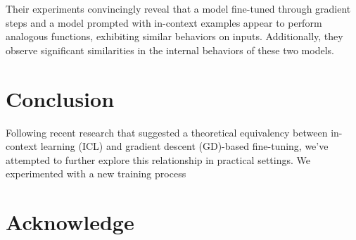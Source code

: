 \documentclass[11pt]{article}
\begin{document}
Their experiments convincingly reveal that a model fine-tuned through gradient steps and a model prompted with in-context examples appear to perform analogous functions, exhibiting similar behaviors on inputs.
Additionally, they observe significant similarities in the internal behaviors of these two models.




\section{Conclusion}
Following recent research that suggested a theoretical equivalency between in-context learning (ICL) and gradient descent (GD)-based fine-tuning, we've attempted to further explore this relationship in practical settings.
We experimented with a new training process 
\section{Acknowledge}

\nocite{rw1}
\nocite{rw2}




\newpage
\appendix
\end{document}
